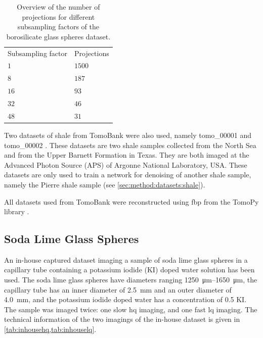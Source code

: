 \begin{table}[htbp]
    \centering
    \caption[Projection subsampling overview for reconstructions of the borosilicate glass spheres dataset.]{Overview of the number of projections for different subsampling factors of the borosilicate glass spheres dataset. }
    \label{tab:projectionsubsampling}
    \begin{tabular}{ll}
    \hline
    Subsampling factor & Projections \\
    \hhline{==}
    $1$ & $1500$ \\
    $8$ & $187$ \\
    $16$ & $93$ \\
    $32$ & $46$ \\
    $48$ & $31$ \\
    \hline
    \end{tabular}
\end{table}

Two datasets of shale from TomoBank were also used, namely tomo\_00001 and tomo\_00002 \cite{datasetshale}. These datasets are two shale samples collected from the North Sea and from the Upper Barnett Formation in Texas. They are both imaged at the Advanced Photon Source (APS) of Argonne National Laboratory, USA. These datasets are only used to train a network for denoising of another shale sample, namely the Pierre shale sample (see \cref{sec:method:datasets:shale}). 

All datasets used from TomoBank were reconstructed using \gls{fbp} from the TomoPy library \cite{tomopy}. 

\subsection{Soda Lime Glass Spheres}
\label{sec:method:datasets:inhouse}
An in-house captured dataset imaging a sample of soda lime glass spheres in a capillary tube containing a potassium iodide (KI) doped water solution has been used. The soda lime glass spheres have diameters ranging \SIrange{1250}{1650}{\micro \meter}, the capillary tube has an inner diameter of \SI{2.5}{\milli \meter} and an outer diameter of \SI{4.0}{\milli \meter}, and the potassium iodide doped water has a concentration of \SI{0.5}{\molar} KI. The sample was imaged twice: one slow \acrlong{hq} imaging, and one fast \acrlong{lq} imaging. The technical information of the two imagings of the in-house dataset is given in \cref{tab:inhousehq,tab:inhouselq}.

